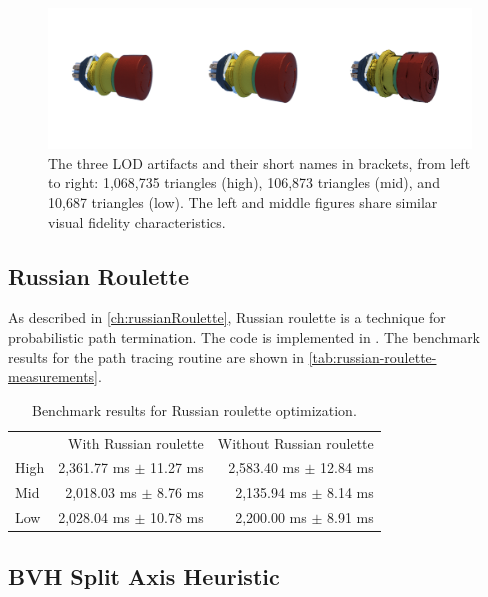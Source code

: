 \begin{figure}[H]
    \centering
    \includegraphics[width=0.9\columnwidth]{resources/benchmark-models.png}
    \caption{The three \gls{LOD} artifacts and their short names in brackets, from left to right: 1,068,735 triangles (high), 106,873 triangles (mid), and 10,687 triangles (low). The left and middle figures share similar visual fidelity characteristics.}
    \label{fig:benchmark-models}
\end{figure}

\subsection*{Russian Roulette}

As described in \autoref{ch:russianRoulette}, Russian roulette is a technique for probabilistic path termination. The code is implemented in . The benchmark results for the path tracing routine are shown in \autoref{tab:russian-roulette-measurements}.

\begin{table}[H]
    \centering
    \begin{tabular}{@{}lrr@{}}
    \toprule
    & With Russian roulette & Without Russian roulette \\
    High & 2,361.77 ms $\pm$ 11.27 ms & 2,583.40 ms $\pm$ 12.84 ms \\
    Mid & 2,018.03 ms $\pm$ 8.76 ms & 2,135.94 ms $\pm$ 8.14 ms \\
    Low & 2,028.04 ms $\pm$ 10.78 ms & 2,200.00 ms $\pm$ 8.91 ms \\
    \bottomrule
    \end{tabular}
    \caption{Benchmark results for Russian roulette optimization.}
    \label{tab:russian-roulette-measurements}
\end{table}

\subsection*{BVH Split Axis Heuristic}

